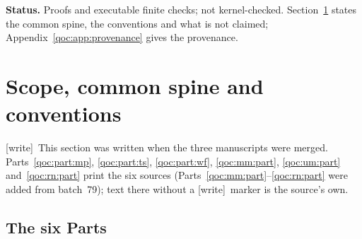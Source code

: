 \documentclass[11pt,letterpaper]{article}
\theoremstyle{definition}
\theoremstyle{remark}
\newcommand{\N}{\mathbb N}
\newcommand{\wtag}{\textup{[write]}}
\newcommand{\Dplus}{D^{+}}
\begin{document}
\begin{titlepage}
\begin{abstract}
Parts~IV--VI (batch~79) add active membranes and reset nets. Part~IV (source~15) certifies one maximally parallel step with weak division and dissolution by quadratic residuals over catalogues of repeated subtrees, independently of the population size (their sum of squares has degree four). Part~V (source~16) gives literal membrane frontends for Part~III's universal machine and quadratic outcome polynomials with $2{,}811T$ witnesses, natural over the nonnegative reals. Part~VI (source~17) builds a fixed reset Petri net with one accepting word per length in $N_{\min}+2\N$, a $2813h$-witness canonical certificate, and a witness bijection for reset traces.

The degree-two constructions of Parts~I--III, V and~VI sit at the level $\Dplus_2=\mathrm{SL}$ of the positivity-restricted degree classification proved in Part~XI of the collection's report \emph{Canonical Diophantine certificates}: they are fixed-horizon or fixed-catalogue certificates, not fixed-arity universal equations, and every Part says so (Part~IV's quartic is one polynomial per finite schema). The report is AI-assisted and unrefereed; nothing in it is formalized in Lean or Rocq, and priority is not certified for any Part.
\end{abstract}
\vfill
\noindent\small\textbf{Status.} Proofs and executable finite checks; not kernel-checked. Section~\ref{qoc:sec:front} states the common spine, the conventions and what is not claimed; Appendix~\ref{qoc:app:provenance} gives the provenance.
\end{titlepage}
\hypersetup{pageanchor=true}

\tableofcontents
\newpage

\section{Scope, common spine and conventions}\label{qoc:sec:front}

\wtag\ This section was written when the three manuscripts were merged. Parts~\ref{qoc:part:mp}, \ref{qoc:part:ts}, \ref{qoc:part:wf}, \ref{qoc:mm:part}, \ref{qoc:um:part} and~\ref{qoc:rn:part} print the six sources (Parts~\ref{qoc:mm:part}--\ref{qoc:rn:part} were added from batch~79); text there without a \wtag\ marker is the source's own.

\subsection{The six Parts}\label{qoc:sec:parts}
\end{document}
